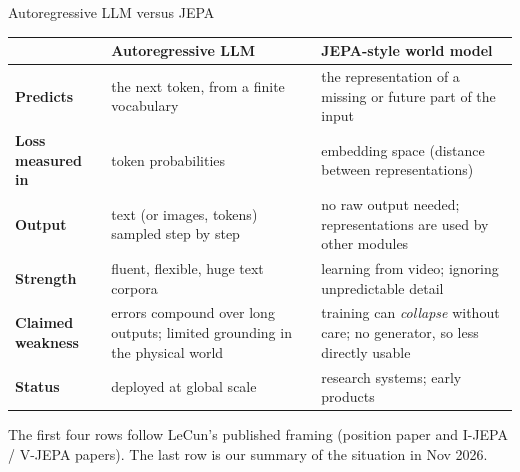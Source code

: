 \begin{frame}{Autoregressive LLM versus JEPA}
\begin{sfig}[0.76]
\begin{tabular}{@{}L{31mm}L{52mm}L{52mm}@{}}
\toprule
 & \textbf{Autoregressive LLM} & \textbf{JEPA-style world model}\\\midrule
\textbf{Predicts} & the next token, from a finite vocabulary & the representation of a missing or future part of the input\\
\textbf{Loss measured in} & token probabilities & embedding space (distance between representations)\\
\textbf{Output} & text (or images, tokens) sampled step by step & no raw output needed; representations are used by other modules\\
\textbf{Strength} & fluent, flexible, huge text corpora & learning from video; ignoring unpredictable detail\\
\textbf{Claimed weakness} & errors compound over long outputs; limited grounding in the physical world & training can \emph{collapse} without care; no generator, so less directly usable\\
\textbf{Status} & deployed at global scale & research systems; early products\\\bottomrule
\end{tabular}
\end{sfig}
\vspace{1mm}
{\small The first four rows follow LeCun's published framing (position paper and I-JEPA / V-JEPA papers). The last row is our summary of the situation in Nov 2026.}
\end{frame}

